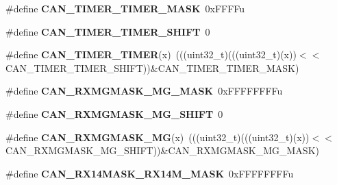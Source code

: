 \begin{DoxyCompactItemize}
\item 
\#define {\bfseries C\+A\+N\+\_\+\+T\+I\+M\+E\+R\+\_\+\+T\+I\+M\+E\+R\+\_\+\+M\+A\+SK}~0x\+F\+F\+F\+Fu\hypertarget{group__CAN__Register__Masks_gaa7323a19c6c05a13fdf8489331e9671f}{}\label{group__CAN__Register__Masks_gaa7323a19c6c05a13fdf8489331e9671f}

\item 
\#define {\bfseries C\+A\+N\+\_\+\+T\+I\+M\+E\+R\+\_\+\+T\+I\+M\+E\+R\+\_\+\+S\+H\+I\+FT}~0\hypertarget{group__CAN__Register__Masks_gac979f0c3637eddae258cc50c0e9bb9cf}{}\label{group__CAN__Register__Masks_gac979f0c3637eddae258cc50c0e9bb9cf}

\item 
\#define {\bfseries C\+A\+N\+\_\+\+T\+I\+M\+E\+R\+\_\+\+T\+I\+M\+ER}(x)~(((uint32\+\_\+t)(((uint32\+\_\+t)(x))$<$$<$C\+A\+N\+\_\+\+T\+I\+M\+E\+R\+\_\+\+T\+I\+M\+E\+R\+\_\+\+S\+H\+I\+FT))\&C\+A\+N\+\_\+\+T\+I\+M\+E\+R\+\_\+\+T\+I\+M\+E\+R\+\_\+\+M\+A\+SK)\hypertarget{group__CAN__Register__Masks_gaf7cbb5a3d2da0895f9e873b71d8c29e8}{}\label{group__CAN__Register__Masks_gaf7cbb5a3d2da0895f9e873b71d8c29e8}

\item 
\#define {\bfseries C\+A\+N\+\_\+\+R\+X\+M\+G\+M\+A\+S\+K\+\_\+\+M\+G\+\_\+\+M\+A\+SK}~0x\+F\+F\+F\+F\+F\+F\+F\+Fu\hypertarget{group__CAN__Register__Masks_ga2d7a5f68a7047b3c535a554cc113ef4b}{}\label{group__CAN__Register__Masks_ga2d7a5f68a7047b3c535a554cc113ef4b}

\item 
\#define {\bfseries C\+A\+N\+\_\+\+R\+X\+M\+G\+M\+A\+S\+K\+\_\+\+M\+G\+\_\+\+S\+H\+I\+FT}~0\hypertarget{group__CAN__Register__Masks_ga1ace67c70d9f25a27ca39ce78cb0034d}{}\label{group__CAN__Register__Masks_ga1ace67c70d9f25a27ca39ce78cb0034d}

\item 
\#define {\bfseries C\+A\+N\+\_\+\+R\+X\+M\+G\+M\+A\+S\+K\+\_\+\+MG}(x)~(((uint32\+\_\+t)(((uint32\+\_\+t)(x))$<$$<$C\+A\+N\+\_\+\+R\+X\+M\+G\+M\+A\+S\+K\+\_\+\+M\+G\+\_\+\+S\+H\+I\+FT))\&C\+A\+N\+\_\+\+R\+X\+M\+G\+M\+A\+S\+K\+\_\+\+M\+G\+\_\+\+M\+A\+SK)\hypertarget{group__CAN__Register__Masks_ga2b21343a7f07965355955eaec76021dc}{}\label{group__CAN__Register__Masks_ga2b21343a7f07965355955eaec76021dc}

\item 
\#define {\bfseries C\+A\+N\+\_\+\+R\+X14\+M\+A\+S\+K\+\_\+\+R\+X14\+M\+\_\+\+M\+A\+SK}~0x\+F\+F\+F\+F\+F\+F\+F\+Fu\hypertarget{group__CAN__Register__Masks_ga4687420a607d4279e24fa93f4b486ec3}{}\label{group__CAN__Register__Masks_ga4687420a607d4279e24fa93f4b486ec3}


\end{DoxyCompactItemize}
